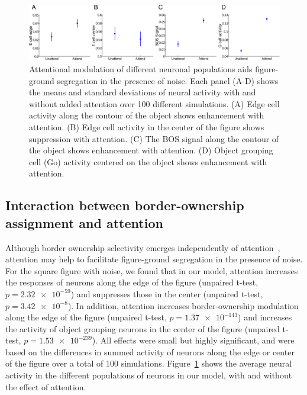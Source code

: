\begin{figure}[t!]
\centering
\includegraphics[width=\textwidth]{Contour/figs/Fig8.eps}
\makeatletter
\let\@currsize\normalsize
\caption[Quantitative comparison of attentional modulation across neuronal populations for figure in noise]{Attentional modulation of different neuronal populations aids figure-ground segregation in the presence of noise. Each panel (A-D) shows the means and standard deviations of neural activity with and without added attention over 100 different simulations. (A) Edge cell activity along the contour of the object shows enhancement with attention. (B) Edge cell activity in the center of the figure shows suppression with attention. (C) The BOS signal along the contour of the object shows enhancement with attention. (D) Object grouping cell (Go) activity centered on the object shows enhancement with attention.}
\label{Fig:Attention_modulation}
\end{figure}

\subsection{Interaction between border-ownership assignment and attention} 
\label{sec:BOS-att}

Although border ownership selectivity emerges independently of attention~\citep{Qiu_etal07}, attention may help to facilitate figure-ground segregation in the presence of noise.  For the square figure with noise, we found that in our model, attention increases the responses of neurons along the edge of the figure (unpaired t-test, $p=\num{2.32e-59}$) and suppresses those in the center (unpaired t-test,
$p=\num{3.42e-8}$). In addition, attention increases border-ownership
modulation along the edge of the figure (unpaired t-test, $p=\num{1.37e-143}$) and increases the activity of object grouping
neurons in the center of the figure (unpaired t-test, $p=\num{1.53e-239}$). All effects were small but highly significant,
and were based on the differences in summed activity of neurons along
the edge or center of the figure over a total of 100 simulations.
Figure~\ref{Fig:Attention_modulation} shows the average neural activity in the different populations of neurons in our model, with and without the effect of attention.  

